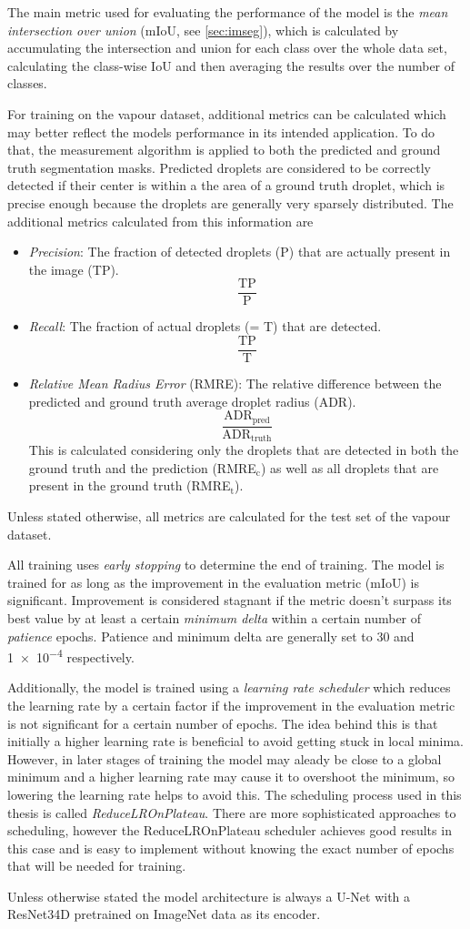 The main metric used for evaluating the performance of the model is the \emph{mean intersection over union} (mIoU, see \ref{sec:imseg}), which is calculated by accumulating the intersection and union for each class over the whole data set, calculating the class-wise IoU and then averaging the results over the number of classes.  

For training on the vapour dataset, additional metrics can be calculated which may better reflect the models performance in its intended application. To do that, the measurement algorithm is applied to both the predicted and ground truth segmentation masks. Predicted droplets are considered to be correctly detected if their center is within a the area of a ground truth droplet, which is precise enough because the droplets are generally very sparsely distributed.
The additional metrics calculated from this information are 
\begin{itemize}
    \item \emph{Precision}: The fraction of detected droplets (P) that are actually present in the image (TP). $$\frac{\text{TP}}{\text{P}}$$
    \item \emph{Recall}: The fraction of actual droplets (= T) that are detected. $$\frac{\text{TP}}{\text{T}}$$
    \item \emph{Relative Mean Radius Error} (RMRE): The relative difference between the predicted and ground truth average droplet radius (ADR). $$\frac{\text{ADR}_\text{pred}}{\text{ADR}_\text{truth}}$$
    This is calculated considering only the droplets that are detected in both the ground truth and the prediction (RMRE$_\text{c}$) as well as all droplets that are present in the ground truth (RMRE$_\text{t}$).
\end{itemize}
Unless stated otherwise, all metrics are calculated for the test set of the vapour dataset.

All training uses \emph{early stopping} to determine the end of training. The model is trained for as long as the improvement in the evaluation metric (mIoU) is significant. Improvement is considered stagnant if the metric doesn't surpass its best value by at least a certain \emph{minimum delta} within a certain number of \emph{patience} epochs. Patience and minimum delta are generally set to 30 and \num{1e-4} respectively.

Additionally, the model is trained using a \emph{learning rate scheduler} which reduces the learning rate by a certain factor if the improvement in the evaluation metric is not significant for a certain number of epochs. The idea behind this is that initially a higher learning rate is beneficial to avoid getting stuck in local minima. However, in later stages of training the model may aleady be close to a global minimum and a higher learning rate may cause it to overshoot the minimum, so lowering the learning rate helps to avoid this. The scheduling process used in this thesis is called \emph{ReduceLROnPlateau}. There are more sophisticated approaches to scheduling, however the ReduceLROnPlateau scheduler achieves good results in this case and is easy to implement without knowing the exact number of epochs that will be needed for training.

Unless otherwise stated the model architecture is always a U-Net with a ResNet34D pretrained on ImageNet data as its encoder.